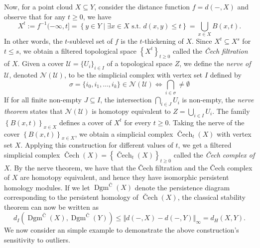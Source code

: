 \documentclass[10pt,a4paper]{article}
\theoremstyle{definition}
\begin{document}
Now, for a point cloud $X\subseteq Y$, consider the distance function $f=d(-,X)$ and observe that for any $t\geq 0$, we have
$$
X^t := f^{-1}(-\infty, t] = \left\{y\in Y\mid\exists x\in X\text{ s.t. }d(x,y)\leq t\right\} = \bigcup_{x\in X}B(x,t).
$$
In other words, the $t$-sublevel set of $f$ is the $t$-thickening of $X$. Since $X^t\subseteq X^s$ for $t\leq s$, we obtain a filtered topological space $\left\{X^t\right\}_{t\geq 0}$ called the \textit{Čech filtration} of $X$. Given a cover $\mathcal{U}=\{U_i\}_{i\in I}$ of a topological space $Z$, we define the \textit{nerve of $\mathcal{U}$}, denoted $\mathcal{N}(\mathcal{U})$, to be the simplicial complex with vertex set $I$ defined by
$$
\sigma = \{i_0, i_1, \ldots, i_k\}\in\mathcal{N}(\mathcal{U})\iff \bigcap_{i\in\sigma}\neq\emptyset
$$
If for all finite non-empty $J\subseteq I$, the intersection $\bigcap_{i\in J} U_i$ is non-empty, the \textit{nerve theorem} states that $\mathcal{N}(\mathcal{U})$ is homotopy equivalent to $Z=\bigcup_{i\in I}U_i$. The family $\left\{B(x,t)\right\}_{x\in X}$ defines a cover of $X^t$ for every $t\geq 0$. Taking the nerve of the cover $\left\{B(x,t)\right\}_{x\in X}$, we obtain a simplicial complex $\operatorname{\text{\v{C}ech}}_t(X)$ with vertex set $X$. Applying this construction for different values of $t$, we get a filtered simplicial complex $\operatorname{\text{\v{C}ech}}(X) =\left\{ \operatorname{\text{\v{C}ech}}_t(X)\right\}_{t\geq 0}$ called the \textit{Čech complex of $X$}. By the nerve theorem, we have that the Čech filtration and the Čech complex of $X$ are homotopy equivalent, and hence they have isomorphic persistent homology modules. If we let $\operatorname{Dgm}^{\text{Č}}(X)$ denote the persistence diagram corresponding to the persistent homology of $\operatorname{\text{\v{C}ech}}(X)$, the classical stability theorem can now be written as 
$$
d_I(\operatorname{Dgm}^{\text{Č}}(X), \operatorname{Dgm}^{\text{Č}}(Y))\leq\Vert d(-,X) - d(-, Y)\Vert_\infty = d_H(X,Y).
$$
We now consider an simple example to demonstrate the above construction's sensitivity to outliers. 
\end{document}

